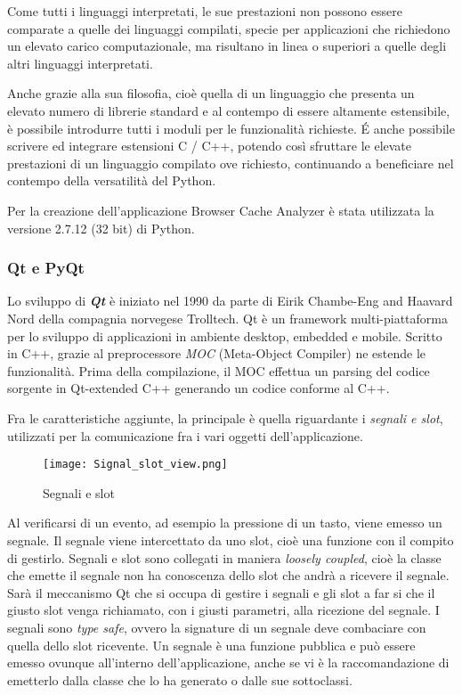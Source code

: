 Come tutti i linguaggi interpretati, le sue prestazioni non possono essere comparate a quelle dei linguaggi compilati, specie per applicazioni che richiedono un elevato carico computazionale, ma risultano in linea o superiori a quelle degli altri linguaggi interpretati.

Anche grazie alla sua filosofia, cioè quella di un linguaggio che presenta un elevato numero di librerie standard e al contempo di essere altamente estensibile, è possibile introdurre tutti i moduli per le funzionalità richieste. 
\'E anche possibile scrivere ed integrare estensioni C / C++, potendo così sfruttare le elevate prestazioni di un linguaggio compilato ove richiesto, continuando a beneficiare nel contempo della versatilità del Python.  

Per la creazione dell'applicazione Browser Cache Analyzer è stata utilizzata la versione 2.7.12 (32 bit) di Python.

\subsubsection{Qt e PyQt} 
\nocite{Qt}
\nocite{PyQt}
Lo sviluppo di \textbf{\textit{Qt}} è iniziato nel 1990 da parte di Eirik Chambe-Eng and Haavard Nord della compagnia norvegese Trolltech. Qt è un framework multi-piattaforma per lo sviluppo di applicazioni in ambiente desktop, embedded e mobile. Scritto in C++, grazie al preprocessore \textit{MOC} (Meta-Object Compiler) ne estende le funzionalità.
Prima della compilazione, il MOC effettua un parsing del codice sorgente in Qt-extended C++ generando un codice conforme al C++. 

Fra le caratteristiche aggiunte, la principale è quella riguardante i \textit{segnali e slot}, utilizzati per la comunicazione fra i vari oggetti dell'applicazione. 

\begin{figure}[htpb]
	\begin{center}
		\texttt{[image: Signal\_slot\_view.png]}
	\end{center}
	\caption[Segnali e slot]{Segnali e slot \footnotemark}
\end{figure}


Al verificarsi di un evento, ad esempio la pressione di un tasto, viene emesso un segnale. Il segnale viene intercettato da uno slot, cioè una funzione con il compito di gestirlo. 
Segnali e slot sono collegati in maniera \textit{loosely coupled}, cioè la classe che emette il segnale non ha conoscenza dello slot che andrà a ricevere il segnale. Sarà il meccanismo Qt che si occupa di gestire i segnali e gli slot a far si che il giusto slot venga richiamato, con i giusti parametri, alla ricezione del segnale. I segnali sono \textit{type safe}, ovvero la signature di un segnale deve combaciare con quella dello slot ricevente. Un segnale è una funzione pubblica e può essere emesso ovunque all'interno dell'applicazione, anche se vi è la raccomandazione di emetterlo dalla classe che lo ha generato o dalle sue sottoclassi.

